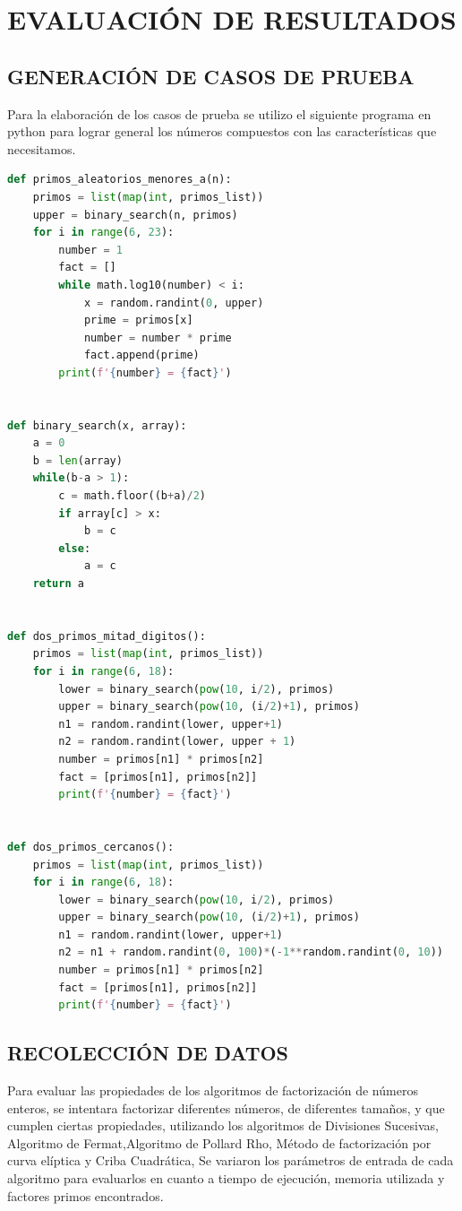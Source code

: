 \clearpage
\chapter{EVALUACIÓN DE RESULTADOS}
\section{GENERACIÓN DE CASOS DE PRUEBA}
Para la elaboración de los casos de prueba se utilizo el siguiente programa en python para lograr general los números compuestos con las características que necesitamos.
\begin{lstlisting}[language=Python]
def primos_aleatorios_menores_a(n):
    primos = list(map(int, primos_list))
    upper = binary_search(n, primos)
    for i in range(6, 23):
        number = 1
        fact = []
        while math.log10(number) < i:
            x = random.randint(0, upper)
            prime = primos[x]
            number = number * prime
            fact.append(prime)
        print(f'{number} = {fact}')


def binary_search(x, array):
    a = 0
    b = len(array)
    while(b-a > 1):
        c = math.floor((b+a)/2)
        if array[c] > x:
            b = c
        else:
            a = c
    return a


def dos_primos_mitad_digitos():
    primos = list(map(int, primos_list))
    for i in range(6, 18):
        lower = binary_search(pow(10, i/2), primos)
        upper = binary_search(pow(10, (i/2)+1), primos)
        n1 = random.randint(lower, upper+1)
        n2 = random.randint(lower, upper + 1)
        number = primos[n1] * primos[n2]
        fact = [primos[n1], primos[n2]]
        print(f'{number} = {fact}')


def dos_primos_cercanos():
    primos = list(map(int, primos_list))
    for i in range(6, 18):
        lower = binary_search(pow(10, i/2), primos)
        upper = binary_search(pow(10, (i/2)+1), primos)
        n1 = random.randint(lower, upper+1)
        n2 = n1 + random.randint(0, 100)*(-1**random.randint(0, 10))
        number = primos[n1] * primos[n2]
        fact = [primos[n1], primos[n2]]
        print(f'{number} = {fact}')
\end{lstlisting}

\section{RECOLECCIÓN DE DATOS}
Para evaluar las propiedades de los algoritmos de factorización de números enteros, se intentara factorizar diferentes números, de diferentes tamaños, y que cumplen ciertas propiedades, utilizando los algoritmos de Divisiones Sucesivas, Algoritmo de Fermat,Algoritmo de Pollard Rho, Método de factorización por curva elíptica y Criba Cuadrática, Se variaron los parámetros de entrada de cada algoritmo para evaluarlos en cuanto a tiempo de ejecución, memoria utilizada y factores primos encontrados.

